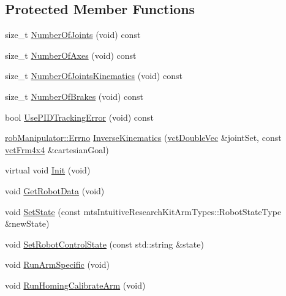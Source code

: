 \subsection*{Protected Member Functions}
\begin{DoxyCompactItemize}
\item 
size\-\_\-t \hyperlink{classmts_intuitive_research_kit_m_t_m_ab2c930542fd9bb5fb9980d58b5adfcc7}{Number\-Of\-Joints} (void) const 
\item 
size\-\_\-t \hyperlink{classmts_intuitive_research_kit_m_t_m_a3cca37b4a49b33d50e084adcab2056ce}{Number\-Of\-Axes} (void) const 
\item 
size\-\_\-t \hyperlink{classmts_intuitive_research_kit_m_t_m_a7d1c7e4d42702e1de35a6ff86920d224}{Number\-Of\-Joints\-Kinematics} (void) const 
\item 
size\-\_\-t \hyperlink{classmts_intuitive_research_kit_m_t_m_a9637724648d75a357ef42b92ee56f60d}{Number\-Of\-Brakes} (void) const 
\item 
bool \hyperlink{classmts_intuitive_research_kit_m_t_m_a4ee00fbedb0e9144c887293c0c6424da}{Use\-P\-I\-D\-Tracking\-Error} (void) const 
\item 
\hyperlink{classrob_manipulator_a7bbb51cdb81c9c681075a9274ca0cdc0}{rob\-Manipulator\-::\-Errno} \hyperlink{classmts_intuitive_research_kit_m_t_m_af697fda230b794918fc4518dcd47a45e}{Inverse\-Kinematics} (\hyperlink{vct_dynamic_vector_types_8h_ade4b3068c86fb88f41af2e5187e491c2}{vct\-Double\-Vec} \&joint\-Set, const \hyperlink{vct_transformation_types_8h_a33da47f4deb2556b37a69a2c44b29d75}{vct\-Frm4x4} \&cartesian\-Goal)
\item 
virtual void \hyperlink{classmts_intuitive_research_kit_m_t_m_a2fcafb8a364a77f39efdda911fb39192}{Init} (void)
\item 
void \hyperlink{classmts_intuitive_research_kit_m_t_m_a261f7401fdf791cf6173c16f1f6223a2}{Get\-Robot\-Data} (void)
\item 
void \hyperlink{classmts_intuitive_research_kit_m_t_m_a81e00eb2f9f23dd10946130e0192956c}{Set\-State} (const mts\-Intuitive\-Research\-Kit\-Arm\-Types\-::\-Robot\-State\-Type \&new\-State)
\item 
void \hyperlink{classmts_intuitive_research_kit_m_t_m_ac41903292eb113d8acf340178dc10aa7}{Set\-Robot\-Control\-State} (const std\-::string \&state)
\item 
void \hyperlink{classmts_intuitive_research_kit_m_t_m_ab0b7000dfd8271c958a3f24e0c454b38}{Run\-Arm\-Specific} (void)
\item 
void \hyperlink{classmts_intuitive_research_kit_m_t_m_ab668fdb4d21a27e39afe975c3f04318e}{Run\-Homing\-Calibrate\-Arm} (void)

\end{DoxyCompactItemize}
